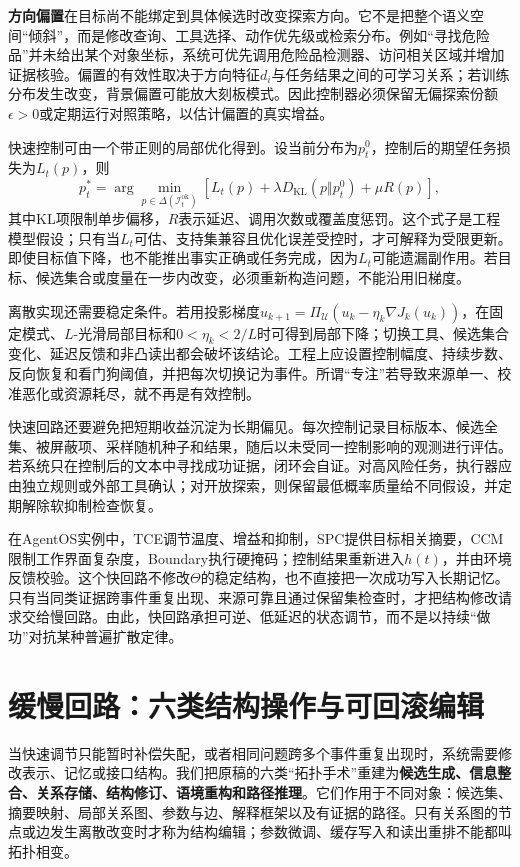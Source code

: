 \textbf{方向偏置}在目标尚不能绑定到具体候选时改变探索方向。它不是把整个语义空间“倾斜”，而是修改查询、工具选择、动作优先级或检索分布。例如“寻找危险品”并未给出某个对象坐标，系统可优先调用危险品检测器、访问相关区域并增加证据核验。偏置的有效性取决于方向特征$d_i$与任务结果之间的可学习关系；若训练分布发生改变，背景偏置可能放大刻板模式。因此控制器必须保留无偏探索份额$\epsilon>0$或定期运行对照策略，以估计偏置的真实增益。

快速控制可由一个带正则的局部优化得到。设当前分布为$p^0_t$，控制后的期望任务损失为$L_t(p)$，则
\[
p_t^*=\arg\min_{p\in\Delta(\mathcal{I}^{\mathrm{ok}}_t)}
\left[L_t(p)+\lambda D_{\mathrm{KL}}(p\Vert p^0_t)+\mu R(p)\right],
\]
其中KL项限制单步偏移，$R$表示延迟、调用次数或覆盖度惩罚。这个式子是工程模型假设；只有当$L_t$可估、支持集兼容且优化误差受控时，才可解释为受限更新。即使目标值下降，也不能推出事实正确或任务完成，因为$L_t$可能遗漏副作用。若目标、候选集合或度量在一步内改变，必须重新构造问题，不能沿用旧梯度。

离散实现还需要稳定条件。若用投影梯度$u_{k+1}=\Pi_{\mathcal{U}}(u_k-\eta_k\nabla J_k(u_k))$，在固定模式、$L$-光滑局部目标和$0<\eta_k<2/L$时可得到局部下降；切换工具、候选集合变化、延迟反馈和非凸读出都会破坏该结论。工程上应设置控制幅度、持续步数、反向恢复和看门狗阈值，并把每次切换记为事件。所谓“专注”若导致来源单一、校准恶化或资源耗尽，就不再是有效控制。

快速回路还要避免把短期收益沉淀为长期偏见。每次控制记录目标版本、候选全集、被屏蔽项、采样随机种子和结果，随后以未受同一控制影响的观测进行评估。若系统只在控制后的文本中寻找成功证据，闭环会自证。对高风险任务，执行器应由独立规则或外部工具确认；对开放探索，则保留最低概率质量给不同假设，并定期解除软抑制检查恢复。

在AgentOS实例中，TCE调节温度、增益和抑制，SPC提供目标相关摘要，CCM限制工作界面复杂度，Boundary执行硬掩码；控制结果重新进入$h(t)$，并由环境反馈校验。这个快回路不修改$\Theta$的稳定结构，也不直接把一次成功写入长期记忆。只有当同类证据跨事件重复出现、来源可靠且通过保留集检查时，才把结构修改请求交给慢回路。由此，快回路承担可逆、低延迟的状态调节，而不是以持续“做功”对抗某种普遍扩散定律。

\section{缓慢回路：六类结构操作与可回滚编辑}
\label{sec:topology_surgery}

当快速调节只能暂时补偿失配，或者相同问题跨多个事件重复出现时，系统需要修改表示、记忆或接口结构。我们把原稿的六类“拓扑手术”重建为\textbf{候选生成、信息整合、关系存储、结构修订、语境重构和路径推理}。它们作用于不同对象：候选集、摘要映射、局部关系图、参数与边、解释框架以及有证据的路径。只有关系图的节点或边发生离散改变时才称为结构编辑；参数微调、缓存写入和读出重排不能都叫拓扑相变。

